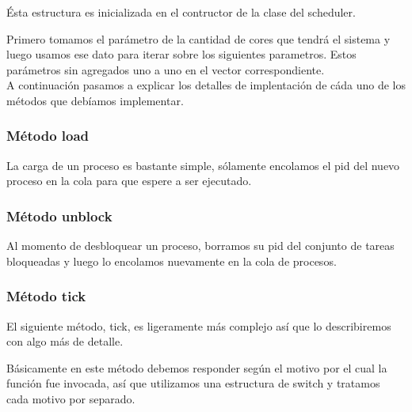 \documentclass[a4paper,11pt]{article}
\begin{document}
			\lstset{
				tabsize=1, %
				aboveskip=15pt, %
				belowskip=15pt, %
			}
	
			Ésta estructura es inicializada en el contructor de la clase del scheduler.
					
			
			Primero tomamos el parámetro de la cantidad de cores que tendrá el sistema y luego usamos ese dato para iterar sobre los siguientes parametros. Estos parámetros sin agregados uno a uno en el vector correspondiente.
			\\
	
			A continuación pasamos a explicar los detalles de implentación de cáda uno de los métodos que debíamos implementar.
		
		\subsubsection*{Método load}
			La carga de un proceso es bastante simple, sólamente encolamos el pid del nuevo proceso en la cola para que espere a ser ejecutado.
	
				
		
		\subsubsection*{Método unblock}
			Al momento de desbloquear un proceso, borramos su pid del conjunto de tareas bloqueadas y luego lo encolamos nuevamente en la cola de procesos.
			
			
	
		\subsubsection*{Método tick}
			El siguiente método, tick, es ligeramente más complejo así que lo describiremos con algo más de detalle.	
			
			Básicamente en este método debemos responder según el motivo por el cual la función fue invocada, así que utilizamos una estructura de switch y tratamos cada motivo por separado.
			
			
			
\end{document}
